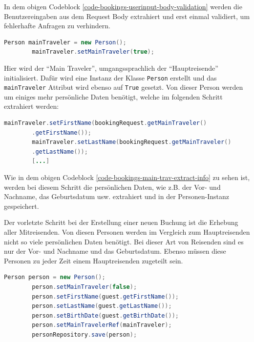 	
	In dem obigen Codeblock \ref{code-bookings-userinput-body-validation} werden die Benutzereingaben aus dem Request Body extrahiert und erst einmal validiert, um fehlerhafte Anfragen zu verhindern.
	
	\begin{lstlisting}[caption={Erstellung des Personen-Objekts sowie setzen der mainTraveler Flag auf True.}, label={code-bookings-extract-main-traveler}, language=Java]
		Person mainTraveler = new Person();
		mainTraveler.setMainTraveler(true);
	\end{lstlisting}
	
	Hier wird der \enquote{Main Traveler}, umgangssprachlich der \enquote{Hauptreisende} initialisiert. Dafür wird eine Instanz der Klasse \texttt{Person} erstellt und das \texttt{mainTraveler} Attribut wird ebenso auf \texttt{True} gesetzt. Von dieser Person werden um einiges mehr persönliche Daten benötigt, welche im folgenden Schritt extrahiert werden:
	
	\begin{lstlisting}[caption={Extrahierung aller persönlichen Daten des Hauptreisenden.}, label={code-bookings-main-trav-extract-info}, language=Java]
		mainTraveler.setFirstName(bookingRequest.getMainTraveler()
		.getFirstName());
		mainTraveler.setLastName(bookingRequest.getMainTraveler()
		.getLastName());
		[...]
	\end{lstlisting}
	
	Wie in dem obigen Codeblock \ref{code-bookings-main-trav-extract-info} zu sehen ist, werden bei diesem Schritt die persönlichen Daten, wie z.B. der Vor- und Nachname, das Geburtsdatum usw. extrahiert und in der Personen-Instanz gespeichert.
	
	Der vorletzte Schritt bei der Erstellung einer neuen Buchung ist die Erhebung aller Mitreisenden. Von diesen Personen werden im Vergleich zum Hauptreisenden nicht so viele persönlichen Daten benötigt. Bei dieser Art von Reisenden sind es nur der Vor- und Nachname und das Geburtsdatum. Ebenso müssen diese Personen zu jeder Zeit einem Hauptreisenden zugeteilt sein.
	
	\begin{lstlisting}[caption={Erhebung aller Daten für jeden Hauptreisenden.}, label={code-bookings-other-travelers}, language=Java]
		Person person = new Person();
		person.setMainTraveler(false);
		person.setFirstName(guest.getFirstName());
		person.setLastName(guest.getLastName());
		person.setBirthDate(guest.getBirthDate());
		person.setMainTravelerRef(mainTraveler);
		personRepository.save(person);
	\end{lstlisting}
	
